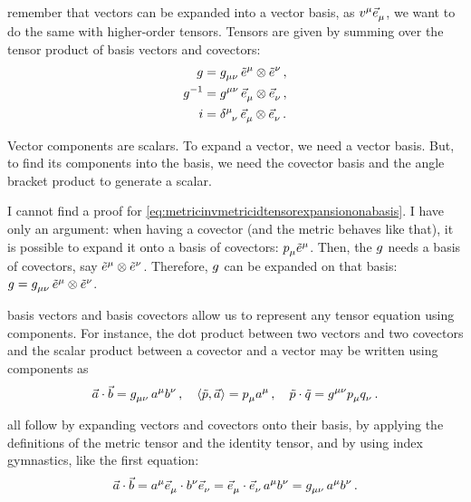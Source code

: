  remember that vectors can be expanded into a vector basis, as $\tvec v\mu\tbvec\mu$, we want to do the same with higher-order tensors. Tensors are given by summing over the tensor product of basis vectors and covectors:
%
\begin{align}\label{eq:metricinvmetricidtensorexpansiononabasis}
  \metric &= \tmetric\mu\nu\,\tbcov\mu\tprod\tbcov\nu \,,\\\nonumber
  \invmet &= \tinvmet\mu\nu\,\tbvec\mu\tprod\tbvec\nu \,,\\\nonumber
  \idtens &= \tkron\mu\nu  \,\tbvec\mu\tprod\tbvec\nu   \,.\nonumber
\end{align}

 Vector components are scalars. To expand a vector, we need a vector basis. But, to find its components into the basis, we need the covector basis and the angle bracket product to generate a scalar.

 I cannot find a proof for \cref{eq:metricinvmetricidtensorexpansiononabasis}. I have only an argument: when having a covector (and the metric behaves like that), it is possible to expand it onto a basis of covectors: $\tcov p\mu\tbcov\mu$. Then, the $g$ needs a basis of covectors, say $\tbcov\mu\tprod\tbcov\nu$. Therefore, $g$ can be expanded on that basis: $\metric = \tmetric\mu\nu\,\tbcov\mu\tprod\tbcov\nu$.

 basis vectors and basis covectors allow us to represent any tensor equation using components. For instance, the dot product between two vectors and two covectors and the scalar product between a covector and a vector may be written using components as
%
\begin{equation}\label{eq:dotproductscalarproductincomponents}
  \vec a\iprod\vec b = \tmetric\mu\nu\,\tvec a\mu\tvec b\nu\,,\quad
  \sprod{\cov p}{\vec a} = \tcov p\mu\tvec a\mu\,,\quad
  \cov p\iprod\cov q = \tinvmet\mu\nu\tcov p\mu\tcov q\nu\,.
\end{equation}

 all follow by expanding vectors and covectors onto their basis, by applying the definitions of the metric tensor and the identity tensor, and by using index gymnastics, like the first equation:
%
\begin{equation*}
  \vec a\iprod\vec b = \tvec a\mu\tbvec\mu\iprod\tvec b\nu\tbvec\nu
                     = \tbvec\mu\iprod\tbvec\nu\,\tvec a\mu\tvec b\nu
                     = \tmetric\mu\nu\,\tvec a\mu\tvec b\nu\,.
\end{equation*}

